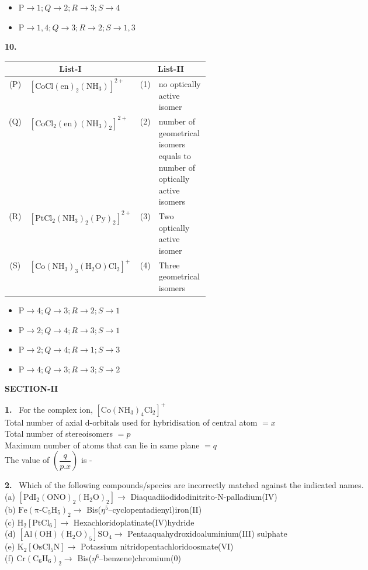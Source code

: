 \documentclass[10pt]{extarticle}
\newcommand{\sect}[1]{\par\smallskip\noindent\textbf{#1}\par}
\newcommand{\qn}[1]{\par\smallskip\noindent\textbf{#1.}~}
\newenvironment{qoptions}{\begin{itemize}[leftmargin=1.8em,itemsep=1pt,topsep=2pt,label={}]}{\end{itemize}}
\newcommand{\opt}[2]{\item[(#1)] #2}
\begin{document}
\begin{multicols}{2}
\begin{qoptions}
\opt{C}{$\mathrm P\to1;Q\to2;R\to3;S\to4$}
\opt{D}{$\mathrm P\to1,4;Q\to3;R\to2;S\to1,3$}
\end{qoptions}
\qn{10} 
\begin{center}
{\footnotesize\setlength{\tabcolsep}{2pt}\begin{tabular}{|c|l|c|p{0.4\linewidth}|}\hline
\multicolumn{2}{|c|}{List-I} & \multicolumn{2}{c|}{List-II}\\\hline
(P) & $\mathrm{[CoCl(en)_2(NH_3)]^{2+}}$ & (1) & no optically active isomer\\\hline
(Q) & $\mathrm{[CoCl_2(en)(NH_3)_2]^{2+}}$ & (2) & number of geometrical isomers equals to number of optically active isomers\\\hline
(R) & $\mathrm{[PtCl_2(NH_3)_2(Py)_2]^{2+}}$ & (3) & Two optically active isomer\\\hline
(S) & $\mathrm{[Co(NH_3)_3(H_2O)Cl_2]^+}$ & (4) & Three geometrical isomers\\\hline
\end{tabular}}
\end{center}
\begin{qoptions}
\opt{A}{$\mathrm P\to4;Q\to3;R\to2;S\to1$}
\opt{B}{$\mathrm P\to2;Q\to4;R\to3;S\to1$}
\opt{C}{$\mathrm P\to2;Q\to4;R\to1;S\to3$}
\opt{D}{$\mathrm P\to4;Q\to3;R\to3;S\to2$}
\end{qoptions}
\sect{SECTION-II}
\qn{1} For the complex ion, $\mathrm{[Co(NH_3)_4Cl_2]^+}$\\
Total number of axial d-orbitals used for hybridisation of central atom $=x$\\
Total number of stereoisomers $=p$\\
Maximum number of atoms that can lie in same plane $=q$\\
The value of $\left(\dfrac{q}{p.x}\right)$ is -
\qn{2} Which of the following compounds/species are incorrectly matched against the indicated names.\\
(a) $\mathrm{[PdI_2(ONO)_2(H_2O)_2]}\to$ Diaquadiiodidodinitrito-N-palladium(IV)\\
(b) $\mathrm{Fe(\pi\text{-}C_5H_5)_2}\to$ Bis($\eta^5$--cyclopentadienyl)iron(II)\\
(c) $\mathrm{H_2[PtCl_6]}\to$ Hexachloridoplatinate(IV)hydride\\
(d) $\mathrm{[Al(OH)(H_2O)_5]SO_4}\to$ Pentaaquahydroxidoaluminium(III) sulphate\\
(e) $\mathrm{K_2[OsCl_5N]}\to$ Potassium nitridopentachloridoosmate(VI)\\
(f) $\mathrm{Cr(C_6H_6)_2}\to$ Bis($\eta^6$--benzene)chromium(0)

\end{multicols}
\end{document}
